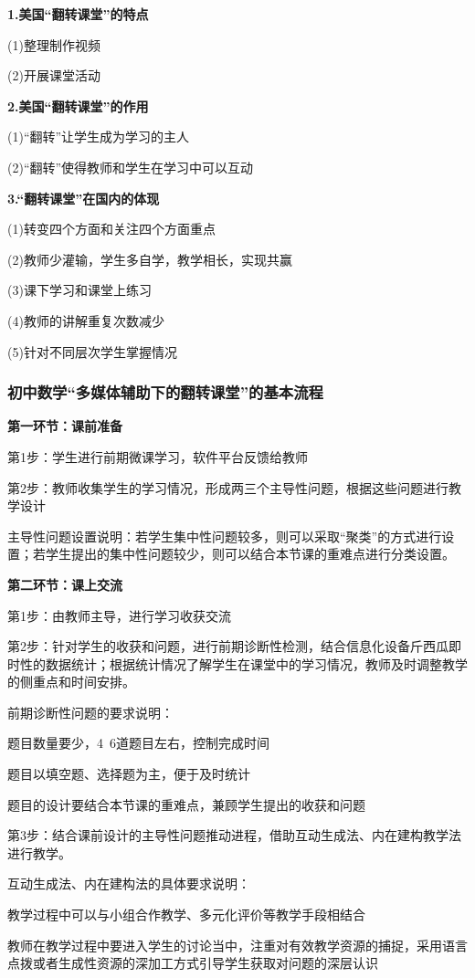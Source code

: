\documentclass{article}
\begin{document}
\textbf{1.美国“翻转课堂”的特点}

(1)整理制作视频

(2)开展课堂活动

\textbf{2.美国“翻转课堂”的作用}

(1)“翻转”让学生成为学习的主人

(2)“翻转”使得教师和学生在学习中可以互动

\textbf{3.“翻转课堂”在国内的体现}

(1)转变四个方面和关注四个方面重点

(2)教师少灌输，学生多自学，教学相长，实现共赢

(3)课下学习和课堂上练习

(4)教师的讲解重复次数减少

(5)针对不同层次学生掌握情况

\subsubsection{初中数学“多媒体辅助下的翻转课堂”的基本流程}

\textbf{第一环节：课前准备}

第1步：学生进行前期微课学习，软件平台反馈给教师

第2步：教师收集学生的学习情况，形成两三个主导性问题，根据这些问题进行教学设计

主导性问题设置说明：若学生集中性问题较多，则可以采取“聚类”的方式进行设置；若学生提出的集中性问题较少，则可以结合本节课的重难点进行分类设置。

\textbf{第二环节：课上交流}

第1步：由教师主导，进行学习收获交流

第2步：针对学生的收获和问题，进行前期诊断性检测，结合信息化设备斤西瓜即时性的数据统计；根据统计情况了解学生在课堂中的学习情况，教师及时调整教学的侧重点和时间安排。

前期诊断性问题的要求说明：

题目数量要少，4~6道题目左右，控制完成时间

题目以填空题、选择题为主，便于及时统计

题目的设计要结合本节课的重难点，兼顾学生提出的收获和问题

第3步：结合课前设计的主导性问题推动进程，借助互动生成法、内在建构教学法进行教学。

互动生成法、内在建构法的具体要求说明：

教学过程中可以与小组合作教学、多元化评价等教学手段相结合

教师在教学过程中要进入学生的讨论当中，注重对有效教学资源的捕捉，采用语言点拨或者生成性资源的深加工方式引导学生获取对问题的深层认识
\end{document}
